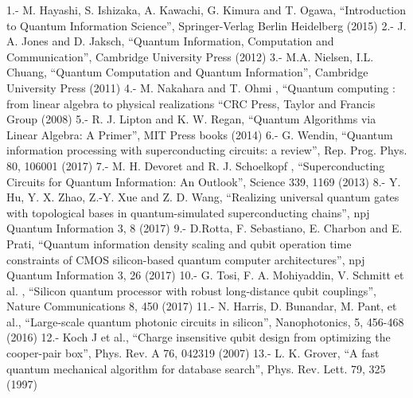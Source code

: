 1.- M. Hayashi, S. Ishizaka, A. Kawachi, G. Kimura and T. Ogawa, “Introduction to Quantum Information Science”, Springer-Verlag Berlin Heidelberg (2015)
2.- J. A. Jones and D. Jaksch, “Quantum Information, Computation and Communication”, Cambridge University Press (2012)
3.- M.A. Nielsen, I.L. Chuang, “Quantum Computation and Quantum Information”, Cambridge University Press (2011)
4.- M. Nakahara and T. Ohmi , “Quantum computing : from linear algebra to physical realizations “CRC Press, Taylor and Francis Group (2008)
5.- R. J. Lipton and K. W. Regan, “Quantum Algorithms via Linear Algebra: A Primer”, MIT Press books (2014)
6.- G. Wendin, “Quantum information processing with superconducting circuits: a review”, Rep. Prog.  Phys. 80, 106001 (2017)
7.- M. H. Devoret and R. J. Schoelkopf , “Superconducting Circuits for Quantum Information: An Outlook”, Science 339, 1169 (2013)
8.- Y. Hu, Y. X. Zhao, Z.-Y. Xue and Z. D. Wang, “Realizing universal quantum gates with topological bases in quantum-simulated superconducting chains”, npj Quantum Information 3, 8 (2017)
9.- D.Rotta, F. Sebastiano, E. Charbon and E. Prati, “Quantum information density scaling and qubit operation time constraints of CMOS silicon-based quantum computer architectures”, npj Quantum Information 3, 26 (2017)
10.- G. Tosi, F. A. Mohiyaddin, V. Schmitt et al. , “Silicon quantum processor with robust long-distance qubit couplings”, Nature Communications 8, 450 (2017)
11.- N. Harris, D. Bunandar, M. Pant, et al., “Large-scale quantum photonic circuits in silicon”, Nanophotonics, 5, 456-468 (2016)
12.- Koch J et al., “Charge insensitive qubit design from optimizing the cooper-pair box”, Phys. Rev. A 76, 042319 (2007)
13.- L. K. Grover, “A fast quantum mechanical algorithm for database search”, Phys. Rev. Lett. 79, 325 (1997)


